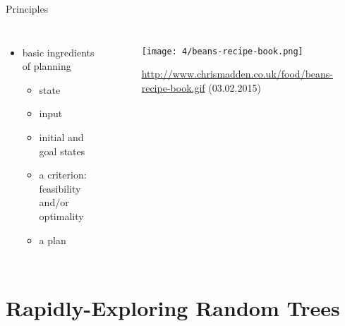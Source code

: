 \documentclass[%
  professionalfonts,%
  xcolor={%
    usenames,%
    dvipsnames,%
    svgnames,%
    table,%
    hyperref%
  }%
]{beamer}
\begin{document}
      \begin{frame}{Principles}
        \begin{columns}
          \begin{itemize}
            \item basic ingredients of planning
            \begin{itemize}
              \item state
              \item input
              \item initial and goal states
              \item a criterion: feasibility and/or optimality
              \item a plan
            \end{itemize}
          \end{itemize}
          
          \begin{figure}[h]
            \texttt{[image: 4/beans-recipe-book.png]}
            \scriptsize\caption{\scriptsize\url{http://www.chrismadden.co.uk/food/beans-recipe-book.gif} (03.02.2015)}
            \label{fig:/determined-challenge-accepte}
          \end{figure}
        \end{columns}
      \end{frame}
    
  \section{Rapidly-Exploring Random Trees}
    \begin{frame}
      \huge{}
    \end{frame}
    
\end{document}
